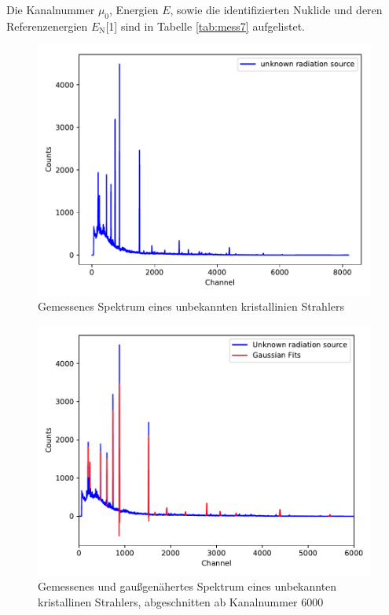 Die Kanalnummer $\mu_0$, Energien $E$, sowie die identifizierten Nuklide und deren Referenzenergien $E_\text{N}$[1]
sind in Tabelle \ref{tab:mess7} aufgelistet. \\

\begin{figure}
  \centering
  \includegraphics[scale=0.6]{content/plot41.pdf}
  \caption{Gemessenes Spektrum eines unbekannten kristallinien Strahlers}
  \label{fig:plot41}
\end{figure}

\begin{figure}
  \centering
  \includegraphics[scale=0.6]{content/plot4.pdf}
  \caption{Gemessenes und gaußgenähertes Spektrum eines unbekannten kristallinen Strahlers,
           abgeschnitten ab Kanalnummer $\num{6000}$}
  \label{fig:plot4} 
\end{figure}


